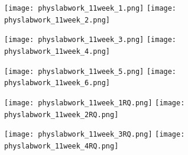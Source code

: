 \documentclass[a4paper,12pt]{article} %
\begin{document}
\begin{figure}[h!]
\begin{floatrow}
         {\texttt{[image: physlabwork\_11week\_1.png]}}
         {\texttt{[image: physlabwork\_11week\_2.png]}}         
\end{floatrow}
\end{figure}

\begin{figure}[h!]
\begin{floatrow}
         {\texttt{[image: physlabwork\_11week\_3.png]}}
         {\texttt{[image: physlabwork\_11week\_4.png]}}         
\end{floatrow}
\end{figure}

\begin{figure}[h!]
\begin{floatrow}
         {\texttt{[image: physlabwork\_11week\_5.png]}}
         {\texttt{[image: physlabwork\_11week\_6.png]}}         
\end{floatrow}
\end{figure}
\restoregeometry

\begin{figure}[h!]
\begin{floatrow}
         {\texttt{[image: physlabwork\_11week\_1RQ.png]}}
         {\texttt{[image: physlabwork\_11week\_2RQ.png]}}         
\end{floatrow}
\end{figure}

\begin{figure}[h!]
\begin{floatrow}
         {\texttt{[image: physlabwork\_11week\_3RQ.png]}}
         {\texttt{[image: physlabwork\_11week\_4RQ.png]}}         
\end{floatrow}
\end{figure}
\end{document}
